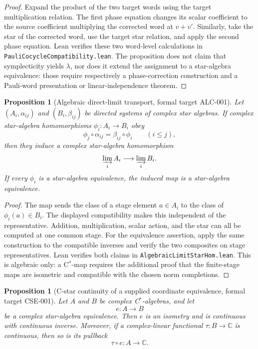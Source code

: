 \documentclass{article}
\newtheorem{proposition}[definition]{Proposition}
\begin{document}
\begin{proof}
Expand the product of the two target words using the target multiplication
relation.  The first phase equation changes its scalar coefficient to the
source coefficient multiplying the corrected word at $v+v'$.  Similarly,
take the star of the corrected word, use the target star relation, and apply
the second phase equation.  Lean verifies these two word-level calculations
in \texttt{PauliCocycleCompatibility.lean}.  The proposition does not claim
that symplecticity yields $\lambda$, nor does it extend the assignment to a
star-algebra equivalence: those require respectively a phase-correction
construction and a Pauli-word presentation or linear-independence theorem.
\end{proof}

\begin{proposition}[Algebraic direct-limit transport, formal target ALC-001]
\label{prop:algebraic_direct_limit_transport}
Let $(A_i,\alpha_{ij})$ and $(B_i,\beta_{ij})$ be directed systems of complex
star algebras.  If complex star-algebra homomorphisms
$\phi_i:A_i\to B_i$ obey
\begin{equation*}
  \phi_j\circ\alpha_{ij}=\beta_{ij}\circ\phi_i
  \qquad (i\leq j),
\end{equation*}
then they induce a complex star-algebra homomorphism
\begin{equation*}
  \varinjlim_i A_i\longrightarrow\varinjlim_i B_i.
\end{equation*}
If every $\phi_i$ is a star-algebra equivalence, the induced map is a
star-algebra equivalence.
\end{proposition}

\begin{proof}
The map sends the class of a stage element $a\in A_i$ to the class of
$\phi_i(a)\in B_i$.  The displayed compatibility makes this independent of
the representative.  Addition, multiplication, scalar action, and the star
can all be computed at one common stage.  For the equivalence assertion,
apply the same construction to the compatible inverses and verify the two
composites on stage representatives.  Lean verifies both claims in
\texttt{AlgebraicLimitStarHom.lean}.  This is algebraic only: a C$^*$-map
requires the additional proof that the finite-stage maps are isometric and
compatible with the chosen norm completions.
\end{proof}

\begin{proposition}[C-star continuity of a supplied coordinate equivalence,
formal target CSE-001]
Let $A$ and $B$ be complex C$^*$-algebras, and let
\begin{equation*}
  e:A\longrightarrow B
\end{equation*}
be a complex star-algebra equivalence.  Then $e$ is an isometry and is
continuous with continuous inverse.  Moreover, if a complex-linear functional
$\tau:B\to\mathbb C$ is continuous, then so is its pullback
\begin{equation*}
  \tau\circ e:A\longrightarrow\mathbb C.
\end{equation*}
\end{proposition}
\end{document}
